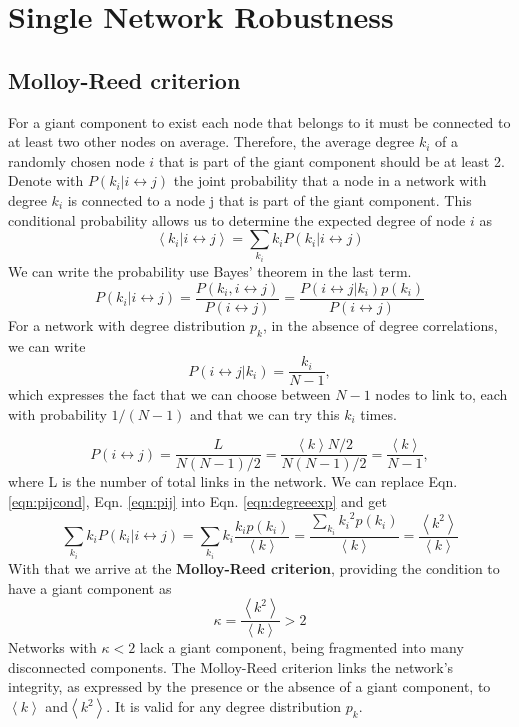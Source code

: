 \documentclass[11pt]{article}
\newcommand{\expbracket}[1]{\left \langle #1  \right \rangle}
\begin{document}
\section{Single Network Robustness}
\label{single_network_robustness}
\subsection{Molloy-Reed criterion}
For a giant component to exist each node that belongs to it must be connected to at least two other nodes on average. Therefore, the average degree $k_i$ of a randomly chosen node $i$ that is part of the giant component should be at least 2. Denote with $P(k_i | i \leftrightarrow j)$ the joint probability that a node in a network with degree $k_i$ is connected to a node j that is part of the
giant component. This conditional probability allows us to determine the expected degree of node $i$ as
\begin{equation}
    \expbracket{k_i | i \leftrightarrow j} = \sum_{k_i} k_iP(k_i | i \leftrightarrow j)
    \label{eqn:degreeexp}
\end{equation}
We can write the probability use Bayes' theorem in the last term.
\begin{equation}
    P(k_i | i \leftrightarrow j) = \frac{P(k_i, i \leftrightarrow j)}{P(i \leftrightarrow j)} = \frac{P(i \leftrightarrow j | k_i)p(k_i)}{P(i \leftrightarrow j)}
\end{equation} 
For a network with degree distribution $p_k$, in the absence of degree correlations, we can write
\begin{equation}
    P(i \leftrightarrow j | k_i) = \frac{k_i}{N-1},
    \label{eqn:pijcond}
\end{equation}
which expresses the fact that we can choose between $N-1$ nodes to link to, each with probability $1/(N-1)$ and that we can try this $k_i$ times. 

\begin{equation}
    P(i \leftrightarrow j) = \frac{L}{N(N-1)/2} = \frac{\expbracket{k}N/2}{N(N-1)/2} = \frac{\expbracket{k}}{N-1} ,
    \label{eqn:pij}
\end{equation}
where L is the number of total links in the network. We can replace Eqn. \ref{eqn:pijcond}, Eqn. \ref{eqn:pij} into Eqn. \ref{eqn:degreeexp} and get
\begin{equation}
    \sum_{k_i} k_iP(k_i | i \leftrightarrow j) = \sum_{k_i} k_i \frac{k_i p(k_i)}{\expbracket{k}} = \frac{\sum_{k_i}{k_i}^2 p(k_i)}{\expbracket{k}} = \frac{\expbracket{k^2}}{\expbracket{k}}
\end{equation}
With that we arrive at the \textbf{Molloy-Reed criterion}, providing the condition to have a giant component as 
\begin{equation}
    \kappa = \frac{\expbracket{k^2}}{\expbracket{k}} > 2
\end{equation}
Networks with $\kappa < 2$ lack a giant component, being fragmented into many disconnected components. The Molloy-Reed criterion links the network’s integrity, as expressed by the presence or the absence of a giant component, to $\expbracket{k}$ and$\expbracket{k^2}$. It is valid for any degree distribution $p_k$.
 
\end{document}
